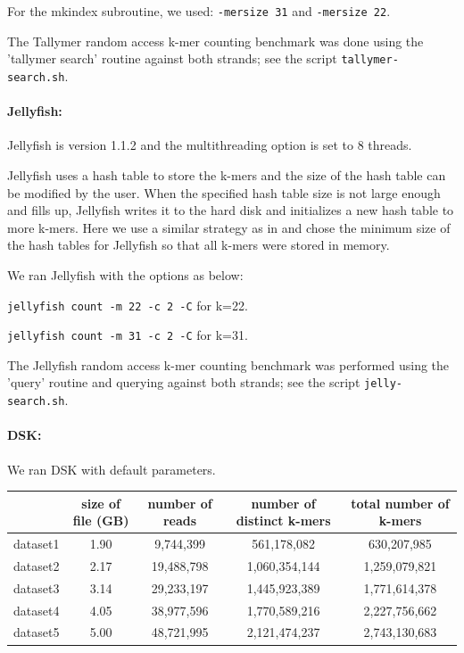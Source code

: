 \documentclass{article}
\begin{document}
For the mkindex subroutine, we used: {\tt -mersize 31} and {\tt -mersize 22}.

The Tallymer random access k-mer counting benchmark was done using the
'tallymer search' routine against both strands; see the script
{\tt tallymer-search.sh}.

\paragraph{Jellyfish:}
Jellyfish is version 1.1.2 and the multithreading option is set to 8 threads.

Jellyfish uses a hash table to store the k-mers and the size of the
hash table can be modified by the user.  When the specified hash table
size is not large enough and fills up, Jellyfish writes it to the hard
disk and initializes a new hash table to more k-mers.  Here we use a
similar strategy as in \cite{Melsted2011} and chose the minimum size of the hash 
tables for Jellyfish so that all k-mers were stored in memory.

We ran Jellyfish with the options as below:

{\tt jellyfish count -m 22 -c 2 -C} for k=22.

{\tt jellyfish count -m 31 -c 2 -C} for k=31.

The Jellyfish random access k-mer counting benchmark was performed
using the 'query' routine and querying against both strands; see
the script {\tt jelly-search.sh}.

\paragraph{DSK:} We ran DSK with default parameters.



\begin{table}[ht]
    \begin{tabular}{ |c | c |c| c|c| }
      \hline                        
       & size of file (GB) & number of reads & number of distinct
      k-mers & total number of k-mers \\
      \hline
    dataset1 & 1.90 & 9,744,399 & 561,178,082 & 630,207,985
    \\
    dataset2 & 2.17 & 19,488,798 & 1,060,354,144 & 1,259,079,821
    \\ 
    dataset3 & 3.14 & 29,233,197 & 1,445,923,389 & 1,771,614,378
    \\ 
    dataset4 & 4.05 & 38,977,596 & 1,770,589,216 & 2,227,756,662
    \\ 
    dataset5 & 5.00 & 48,721,995 & 2,121,474,237 & 2,743,130,683
    \\
      \hline  
    \end{tabular}
\end{table}
\end{document}
